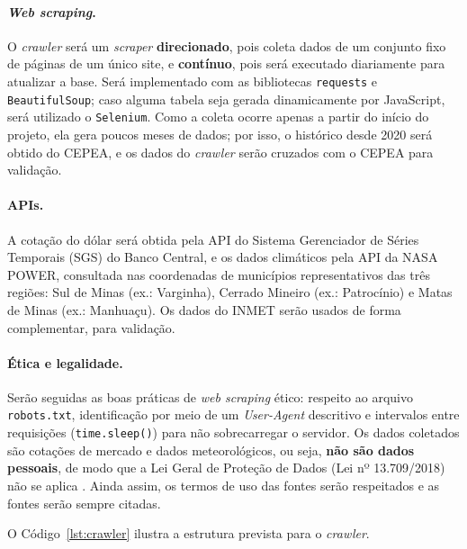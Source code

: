 \documentclass{article}
\begin{document}
\paragraph{\textit{Web scraping}.} O \textit{crawler} será um \textit{scraper} \textbf{direcionado}, pois
coleta dados de um conjunto fixo de páginas de um único site, e \textbf{contínuo}, pois será executado
diariamente para atualizar a base. Será implementado com as bibliotecas \texttt{requests} e
\texttt{BeautifulSoup}; caso alguma tabela seja gerada dinamicamente por JavaScript, será utilizado o
\texttt{Selenium}. Como a coleta ocorre apenas a partir do início do projeto, ela gera poucos meses de
dados; por isso, o histórico desde 2020 será obtido do CEPEA, e os dados do \textit{crawler} serão
cruzados com o CEPEA para validação.

\paragraph{APIs.} A cotação do dólar será obtida pela API do Sistema Gerenciador de Séries Temporais (SGS)
do Banco Central, e os dados climáticos pela API da NASA POWER, consultada nas coordenadas de municípios
representativos das três regiões: Sul de Minas (ex.: Varginha), Cerrado Mineiro (ex.: Patrocínio) e
Matas de Minas (ex.: Manhuaçu). Os dados do INMET serão usados de forma complementar, para validação.

\paragraph{Ética e legalidade.} Serão seguidas as boas práticas de \textit{web scraping} ético: respeito
ao arquivo \texttt{robots.txt}, identificação por meio de um \textit{User-Agent} descritivo e intervalos
entre requisições (\texttt{time.sleep()}) para não sobrecarregar o servidor. Os dados coletados são
cotações de mercado e dados meteorológicos, ou seja, \textbf{não são dados pessoais}, de modo que a Lei
Geral de Proteção de Dados (Lei nº 13.709/2018) não se aplica \cite{lgpd}. Ainda assim, os termos de uso
das fontes serão respeitados e as fontes serão sempre citadas.

O Código~\ref{lst:crawler} ilustra a estrutura prevista para o \textit{crawler}.
\end{document}
